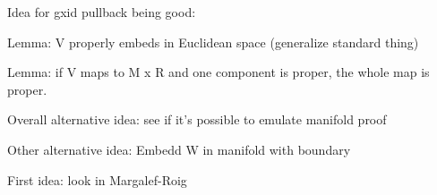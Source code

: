 \documentclass[12pt]{article}
\theoremstyle{plain}
\theoremstyle{definition}
\theoremstyle{remark}
\begin{document}
Idea for gxid pullback being good:

Lemma: V properly embeds in Euclidean space (generalize standard thing)

Lemma: if V maps to M x R and one component is proper, the whole map is proper.


Overall alternative idea: see if it's possible to emulate manifold proof

Other alternative idea: Embedd W in manifold with boundary

First idea: look in Margalef-Roig




\end{document}
